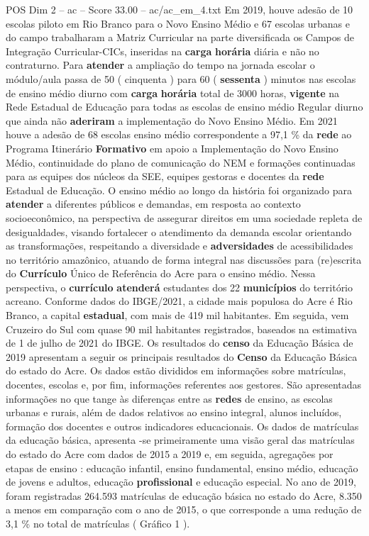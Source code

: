 \begin{textsample}{POS Dim 2 – ac – Score 33.00 – ac/ac\_em\_4.txt}
Em 2019, houve adesão de 10 escolas piloto em Rio Branco para o Novo Ensino Médio e 67 escolas urbanas e do campo trabalharam a Matriz Curricular na parte diversificada os Campos de Integração Curricular-CICs, inseridas na \textbf{carga} \textbf{horária} diária e não no contraturno.
Para \textbf{atender} a ampliação do tempo na jornada escolar o módulo/aula passa de 50 ( cinquenta ) para 60 ( \textbf{sessenta} ) minutos nas escolas de ensino médio diurno com \textbf{carga} \textbf{horária} total de 3000 horas, \textbf{vigente} na Rede Estadual de Educação para todas as escolas de ensino médio Regular diurno que ainda não \textbf{aderiram} a implementação do Novo Ensino Médio.
Em 2021 houve a adesão de 68 escolas ensino médio correspondente a 97,1 \% da \textbf{rede} ao Programa Itinerário \textbf{Formativo} em apoio a Implementação do Novo Ensino Médio, continuidade do plano de comunicação do NEM e formações continuadas para as equipes dos núcleos da SEE, equipes gestoras e docentes da \textbf{rede} Estadual de Educação.
O ensino médio ao longo da história foi organizado para \textbf{atender} a diferentes públicos e demandas, em resposta ao contexto socioeconômico, na perspectiva de assegurar direitos em uma sociedade repleta de desigualdades, visando fortalecer o atendimento da demanda escolar orientando as transformações, respeitando a diversidade e \textbf{adversidades} de acessibilidades no território amazônico, atuando de forma integral nas discussões para (re)escrita do \textbf{Currículo} Único de Referência do Acre para o ensino médio.
Nessa perspectiva, o \textbf{currículo} \textbf{atenderá} estudantes dos 22 \textbf{municípios} do território acreano.
Conforme dados do IBGE/2021, a cidade mais populosa do Acre é Rio Branco, a capital \textbf{estadual}, com mais de 419 mil habitantes.
Em seguida, vem Cruzeiro do Sul com quase 90 mil habitantes registrados, baseados na estimativa de 1 de julho de 2021 do IBGE.
Os resultados do \textbf{censo} da Educação Básica de 2019 apresentam a seguir os principais resultados do \textbf{Censo} da Educação Básica do estado do Acre.
Os dados estão divididos em informações sobre matrículas, docentes, escolas e, por fim, informações referentes aos gestores.
São apresentadas informações no que tange às diferenças entre as \textbf{redes} de ensino, as escolas urbanas e rurais, além de dados relativos ao ensino integral, alunos incluídos, formação dos docentes e outros indicadores educacionais.
Os dados de matrículas da educação básica, apresenta -se primeiramente uma visão geral das matrículas do estado do Acre com dados de 2015 a 2019 e, em seguida, agregações por etapas de ensino : educação infantil, ensino fundamental, ensino médio, educação de jovens e adultos, educação \textbf{profissional} e educação especial.
No ano de 2019, foram registradas 264.593 matrículas de educação básica no estado do Acre, 8.350 a menos em comparação com o ano de 2015, o que corresponde a uma redução de 3,1 \% no total de matrículas ( Gráfico 1 ).


\end{textsample}
